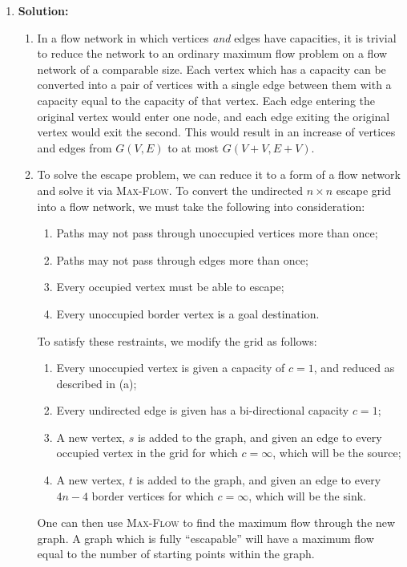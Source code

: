 \documentclass{article}
\begin{document}
\begin{enumerate}
    \item \textbf{Solution:}
    \begin{enumerate}
        \item In a flow network in which vertices \emph{and} edges have
        capacities, it is trivial to reduce the network to an ordinary maximum
        flow problem on a flow network of a comparable size. Each vertex which
        has a capacity can be converted into a pair of vertices with a single
        edge between them with a capacity equal to the capacity of that vertex.
        Each edge entering the original vertex would enter one node, and each
        edge exiting the original vertex would exit the second.  This would
        result in an increase of vertices and edges from $G(V, E)$ to at most
        $G(V+V, E+V)$.
        \item To solve the escape problem, we can reduce it to a form of a
        flow network and solve it via \textsc{Max-Flow}. To convert the
        undirected $n\times n$ escape grid into a flow network, we must take the
        following into consideration:
        \begin{enumerate}
            \item Paths may not pass through unoccupied vertices more than once;
            \item Paths may not pass through edges more than once;
            \item Every occupied vertex must be able to escape;
            \item Every unoccupied border vertex is a goal destination.
        \end{enumerate}
        To satisfy these restraints, we modify the grid as follows:
        \begin{enumerate}
            \item Every unoccupied vertex is given a capacity of $c = 1$, and
            reduced as described in (a);
            \item Every undirected edge is given has a bi-directional capacity $c
            = 1$;
            \item A new vertex, $s$ is added to the graph, and given an edge to
            every occupied vertex in the grid for which $c = \infty$, which will
            be the source;
            \item A new vertex, $t$ is added to the graph, and given an edge to
            every $4n-4$ border vertices for which $c = \infty$, which will be
            the sink.
        \end{enumerate}
        One can then use \textsc{Max-Flow} to find the maximum flow through the
        new graph. A graph which is fully ``escapable'' will have a maximum flow
        equal to the number of starting points within the graph.


\end{enumerate}
\end{enumerate}
\end{document}
